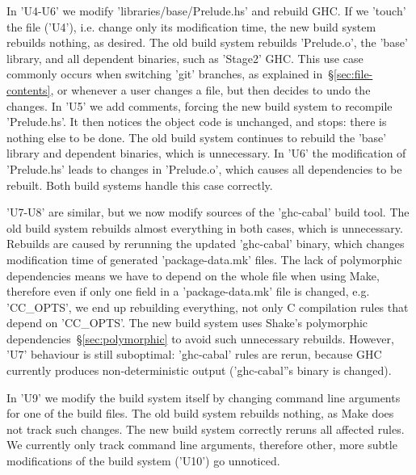 
In \lst'U4-U6' we modify \lst'libraries/base/Prelude.hs' and rebuild GHC.
If we \lst'touch' the file (\lst'U4'), i.e. change only its modification
time, the new build system rebuilds nothing, as desired. The old build system rebuilds
\lst'Prelude.o', the \lst'base' library, and all dependent binaries, such as
\lst'Stage2' GHC. This use case commonly occurs when switching \lst'git'
branches, as explained in~\S\ref{sec:file-contents}, or whenever a user changes
a file, but then decides to undo the changes. In \lst'U5' we add comments,
forcing the new build system to recompile \lst'Prelude.hs'. It then notices the
object code is unchanged, and stops: there is nothing else to be done. The old
build system continues to rebuild the \lst'base' library and dependent binaries,
which is unnecessary. In \lst'U6' the modification of \lst'Prelude.hs' leads to
changes in \lst'Prelude.o', which causes all dependencies to be rebuilt. Both
build systems handle this case correctly.

\lst'U7-U8' are similar, but we now modify sources of the \lst'ghc-cabal' build
tool. The old build system rebuilds almost everything in both cases,
which is unnecessary. Rebuilds are caused by rerunning the updated \lst'ghc-cabal'
binary, which changes modification time of generated \lst'package-data.mk'
files. The lack of polymorphic dependencies means we have to depend on the whole
file when using Make, therefore even if only one field in a
\lst'package-data.mk' file is changed, e.g. \lst'CC_OPTS', we end up
rebuilding everything, not only C compilation rules that depend on
\lst'CC_OPTS'. The new build system uses Shake's polymorphic
dependencies~\S\ref{sec:polymorphic} to avoid such unnecessary rebuilds. However,
\lst'U7' behaviour is still suboptimal: \lst'ghc-cabal' rules
are rerun, because GHC currently produces non-deterministic output
(\lst'ghc-cabal''s binary is changed).

In \lst'U9' we modify the build system itself by changing command line
arguments for one of the build files. The old build system rebuilds nothing,
as Make does not track such changes. The new build system correctly reruns all
affected rules. We currently only track command line arguments, therefore other,
more subtle modifications of the build system (\lst'U10') go unnoticed.


